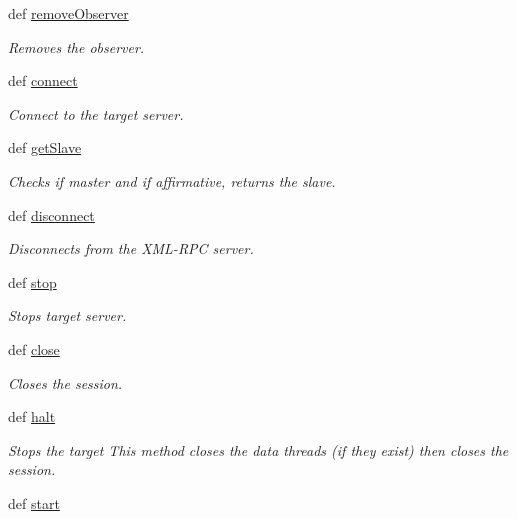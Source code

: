 \begin{DoxyCompactItemize}
def \hyperlink{classpyrtai_1_1target_1_1_target_abe0602fd40e54c1ff92d7310897072ac}{remove\-Observer}
\begin{DoxyCompactList}\small\item\em \-Removes the observer. \end{DoxyCompactList}\item 
def \hyperlink{classpyrtai_1_1target_1_1_target_a8f84994a13eda611de5dc4dc357ba060}{connect}
\begin{DoxyCompactList}\small\item\em \-Connect to the target server. \end{DoxyCompactList}\item 
def \hyperlink{classpyrtai_1_1target_1_1_target_a55c7fb6e7f872139695fad3be58fe811}{get\-Slave}
\begin{DoxyCompactList}\small\item\em \-Checks if master and if affirmative, returns the slave. \end{DoxyCompactList}\item 
def \hyperlink{classpyrtai_1_1target_1_1_target_a6b88fd3e02bd52f9d9596aecaa15414d}{disconnect}
\begin{DoxyCompactList}\small\item\em \-Disconnects from the \-X\-M\-L-\/\-R\-P\-C server. \end{DoxyCompactList}\item 
def \hyperlink{classpyrtai_1_1target_1_1_target_a7a472990dd9d3b1d7c0d3f2aa63ec7a1}{stop}
\begin{DoxyCompactList}\small\item\em \-Stops target server. \end{DoxyCompactList}\item 
def \hyperlink{classpyrtai_1_1target_1_1_target_a12ad20665782eb0e8eac3ea797fbae57}{close}
\begin{DoxyCompactList}\small\item\em \-Closes the session. \end{DoxyCompactList}\item 
def \hyperlink{classpyrtai_1_1target_1_1_target_a8f2a7582fcb34a5244bb5281b34feb47}{halt}
\begin{DoxyCompactList}\small\item\em \-Stops the target \-This method closes the data threads (if they exist) then closes the session. \end{DoxyCompactList}\item 
def \hyperlink{classpyrtai_1_1target_1_1_target_a9a61f08b90d8512663f2c74545943228}{start}

\end{DoxyCompactItemize}
